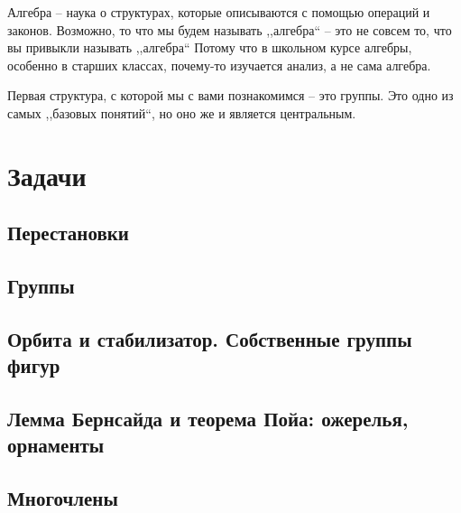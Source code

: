 \documentclass[10pt, twoside]{article}
\begin{document}
\pagestyle{empty}

\newpage

\tableofcontents
\newpage

\setcounter{page}{1}
\pagestyle{fancy}

Алгебра -- наука о структурах, которые описываются с помощью операций и законов. 
Возможно, то что мы будем называть ,,алгебра`` -- это не совсем то, что вы привыкли называть ,,алгебра`` 
Потому что в школьном курсе алгебры, особенно в старших классах, почему-то изучается анализ, а не сама алгебра.

Первая структура, с которой мы с вами познакомимся -- это группы.
Это одно из самых ,,базовых понятий``, но оно же и является центральным. 










\newpage
\renewcommand{\thesubsection}{\roman{subsection}}
\setcounter{subsection}{0}

\section*{Задачи}

\subsection{Перестановки}

\subsection{Группы}

\subsection{Орбита и стабилизатор. Собственные группы фигур}
\subsection{Лемма Бернсайда и теорема Пойа: ожерелья, орнаменты}
% 
\subsection{Многочлены}
% 
\end{document}
